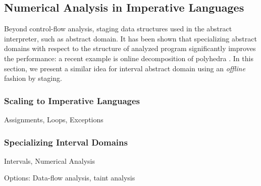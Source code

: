 
\subsection{Numerical Analysis in Imperative Languages} \label{cases_imp}

Beyond control-flow analysis, staging data structures used in the abstract interpreter, such as abstract domain.
It has been shown that specializing abstract domains with respect to the structure of analyzed program significantly 
improves the performance: a recent example is online decomposition of polyhedra \cite{DBLP:conf/popl/SinghPV17, Singh:2017:PCD:3177123.3158143}.
In this section, we present a similar idea for interval abstract domain using an \textit{offline} fashion by staging.

\subsubsection{Scaling to Imperative Languages}

Assignments, Loops, Exceptions

\subsubsection{Specializing Interval Domains}

Intervals, Numerical Analysis

Options: Data-flow analysis, taint analysis
